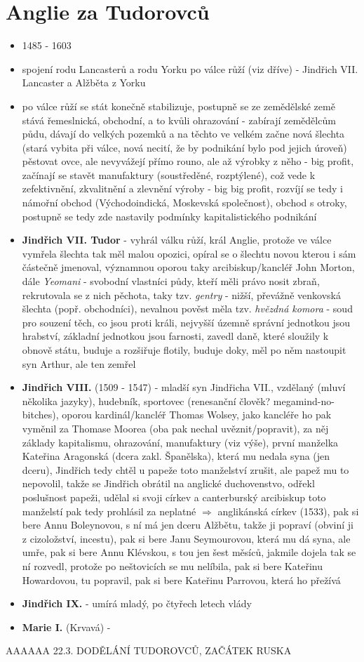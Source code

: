 \documentclass{article}
\begin{document}
\part{Anglie za Tudorovců}
\begin{itemize}
  \item 1485 - 1603
  \item spojení rodu Lancasterů a rodu Yorku po válce růží (viz dříve) - Jindřich VII. Lancaster a Alžběta z Yorku
  \item po válce růží se stát konečně stabilizuje, postupně se ze zemědělské země stává řemeslnická, obchodní, a to kvůli ohrazování - zabírají zemědělcům půdu, dávají do velkých pozemků a na těchto ve velkém začne nová šlechta (stará vybita při válce, nová necití, že by podnikání bylo pod jejich úroveň) pěstovat ovce, ale nevyvážejí přímo rouno, ale až výrobky z něho - big profit, začínají se stavět manufaktury (soustředěné, rozptýlené), což vede k zefektivnění, zkvalitnění a zlevnění výroby - big big profit, rozvíjí se tedy i námořní obchod (Východoindická, Moskevská společnost), obchod s otroky, postupně se tedy zde nastavily podmínky kapitalistického podnikání
  \item \textbf{Jindřich VII. Tudor} - vyhrál válku růží, král Anglie, protože ve válce vymřela šlechta tak měl malou opozici, opíral se o šlechtu novou kterou i sám částečně jmenoval, významnou oporou taky arcibiskup/kancléř John Morton, dále \textit{Yeomani} - svobodní vlastníci půdy, kteří měli právo nosit zbraň, rekrutovala se z nich pěchota, taky tzv. \textit{gentry} - nižší, převážně venkovská šlechta (popř. obchodníci), nevalnou pověst měla tzv. \textit{hvězdná komora} - soud pro souzení těch, co jsou proti králi, nejvyšší územně správní jednotkou jsou hrabství, základní jednotkou jsou farnosti, zavedl daně, které sloužily k obnově státu, buduje a rozšiřuje flotily, buduje doky, měl po něm nastoupit syn Arthur, ale ten zemřel
  \item \textbf{Jindřich VIII.} (1509 - 1547) - mladší syn Jindřicha VII., vzdělaný (mluví několika jazyky), hudebník, sportovec (renesanční člověk? megamind-no-bitches), oporou kardinál/kancléř Thomas Wolsey, jako kancléře ho pak vyměnil za Thomase Moorea (oba pak nechal uvěznit/popravit), za něj základy kapitalismu, ohrazování, manufaktury (viz výše), první manželka Kateřina Aragonská (dcera zakl. Španělska), která mu nedala syna (jen dceru), Jindřich tedy chtěl u papeže toto manželství zrušit, ale papež mu to nepovolil, takže se Jindřich obrátil na anglické duchovenstvo, odřekl poslušnost papeži, udělal si svoji církev a canterburský arcibiskup toto manželstí pak tedy prohlásil za neplatné $\Rightarrow$ anglikánská církev (1533), pak si bere Annu Boleynovou, s ní má jen dceru Alžbětu, takže ji popraví (obviní ji z cizoložství, incestu), pak si bere Janu Seymourovou, která mu dá syna, ale umře, pak si bere Annu Klévskou, s tou jen šest měsíců, jakmile dojela tak se ní rozvedl, protože po neštovicích se mu nelíbila, pak si bere Kateřinu Howardovou, tu popravil, pak si bere Kateřinu Parrovou, která ho přežívá
  \item \textbf{Jindřich IX.} - umírá mladý, po čtyřech letech vlády
  \item \textbf{Marie I.} (Krvavá) -
\end{itemize}
AAAAAA 22.3. DODĚLÁNÍ TUDOROVCŮ, ZAČÁTEK RUSKA
\end{document}
